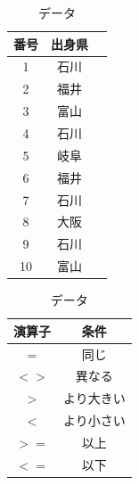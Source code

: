 \begin{table}
\begin{minipage}{0.5\hsize}
    \centering
    \makeatletter
    \def\@captype{table}
    \makeatother
    \caption{データ}
    \begin{tabular}{|c|c|c|}
      \hline
      番号& 出身県\\ \hline
      1   & 石川  \\ \hline
      2   & 福井  \\ \hline
      3   & 富山  \\ \hline
      4   & 石川  \\ \hline
      5   & 岐阜  \\ \hline
      6   & 福井  \\ \hline
      7   & 石川  \\ \hline
      8   & 大阪  \\ \hline
      9   & 石川  \\ \hline
      10  & 富山  \\ \hline
    \end{tabular}
    \label{tab:countif}
\end{minipage}
\begin{minipage}{0.5\hsize}
    \centering
    \makeatletter
    \def\@captype{table}
    \makeatother
    \caption{データ}
    \begin{tabular}{|c|c|}
      \hline
      演算子 & 条件\\ \hline
      $=$      & 同じ\\ \hline
      $<>$     & 異なる\\ \hline
      $>$      & より大きい\\ \hline
      $<$      & より小さい\\ \hline
      $>=$     & 以上\\ \hline
      $<=$     & 以下\\ \hline
    \end{tabular}
    \label{tab:countif_operator}
\end{minipage}
\end{table}


